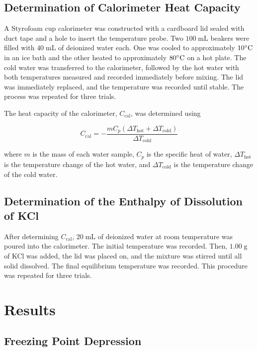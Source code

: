 \documentclass[11pt,letterpaper]{article}
\begin{document}
\subsection*{Determination of Calorimeter Heat Capacity}

A Styrofoam cup calorimeter was constructed with a cardboard lid sealed with duct tape and a hole to insert the temperature probe. Two $100\;\text{mL}$ beakers were filled with $40\;\text{mL}$ of deionized water each. One was cooled to approximately $10^\circ\text{C}$ in an ice bath and the other heated to approximately $80^\circ\text{C}$ on a hot plate. The cold water was transferred to the calorimeter, followed by the hot water with both temperatures measured and recorded immediately before mixing. The lid was immediately replaced, and the temperature was recorded until stable. The process was repeated for three trials.

The heat capacity of the calorimeter, $C_{\text{cal}}$, was determined using

\begin{equation}
C_{\text{cal}} = -\frac{mC_p(\Delta T_{\text{hot}}+\Delta T_{\text{cold}})}{\Delta T_{\text{cold}}}
\end{equation}

where $m$ is the mass of each water sample, $C_p$ is the specific heat of water, $\Delta T_{\text{hot}}$ is the temperature change of the hot water, and $\Delta T_{\text{cold}}$ is the temperature change of the cold water.

\subsection*{Determination of the Enthalpy of Dissolution of KCl}

After determining $C_{\text{cal}}$, $20\;\text{mL}$ of deionized water at room temperature was poured into the calorimeter. The initial temperature was recorded. Then, $1.00\;\text{g}$ of KCl was added, the lid was placed on, and the mixture was stirred until all solid dissolved. The final equilibrium temperature was recorded. This procedure was repeated for three trials. 

\section*{Results}

\subsection*{Freezing Point Depression}
\end{document}
